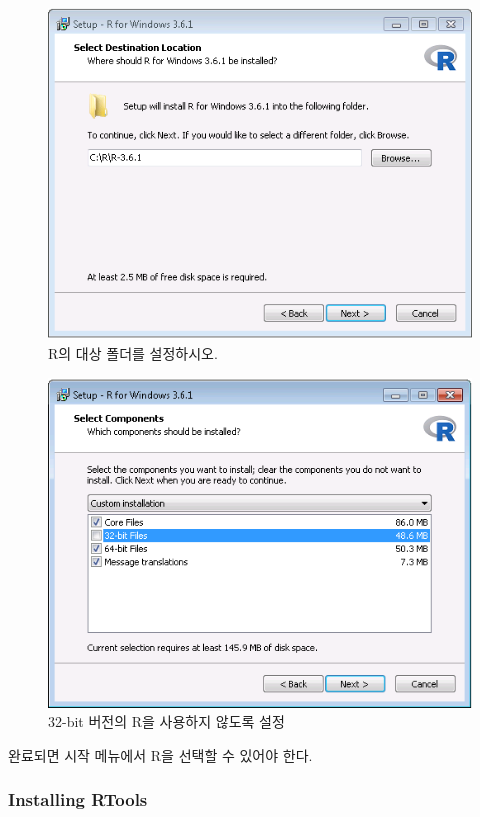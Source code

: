 \documentclass[11pt]{book}
\theoremstyle{definition}
\theoremstyle{definition}
\theoremstyle{definition}
\theoremstyle{remark}
\begin{document}
\begin{figure}

{\centering \includegraphics[width=0.8\linewidth]{images/OhdsiAnalyticsTools/rDestination} 

}

\caption{R의 대상 폴더를 설정하시오.}\label{fig:rDestination}
\end{figure}

\begin{figure}

{\centering \includegraphics[width=0.8\linewidth]{images/OhdsiAnalyticsTools/no32Bits} 

}

\caption{32-bit 버전의 R을 사용하지 않도록 설정}\label{fig:no32Bits}
\end{figure}

완료되면 시작 메뉴에서 R을 선택할 수 있어야 한다.

\subsubsection*{Installing RTools}\label{installing-rtools}
\end{document}
